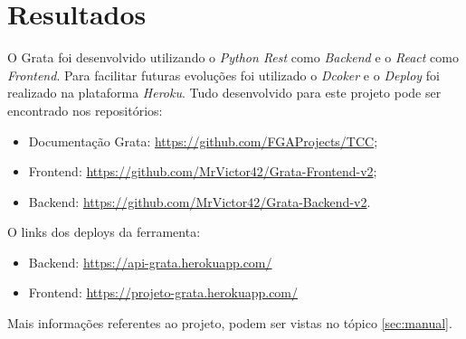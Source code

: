 \chapter[Resultados]{Resultados}
\label{cp:resultados}

O Grata foi desenvolvido utilizando o \textit{Python Rest} como \textit{Backend} e o \textit{React} como \textit{Frontend}. Para facilitar futuras evoluções foi utilizado o \textit{Dcoker} e o \textit{Deploy} foi realizado na plataforma \textit{Heroku}. Tudo desenvolvido para este projeto pode ser encontrado nos repositórios:
\begin{itemize}
    \item Documentação Grata: \url{https://github.com/FGAProjects/TCC};
    \item Frontend: \url{https://github.com/MrVictor42/Grata-Frontend-v2};
    \item Backend: \url{https://github.com/MrVictor42/Grata-Backend-v2}.
\end{itemize}

O links dos deploys da ferramenta:
\begin{itemize}
    \item Backend: \url{https://api-grata.herokuapp.com/}
    \item Frontend: \url{https://projeto-grata.herokuapp.com/}
\end{itemize}

Mais informações referentes ao projeto, podem ser vistas no tópico \ref{sec:manual}.